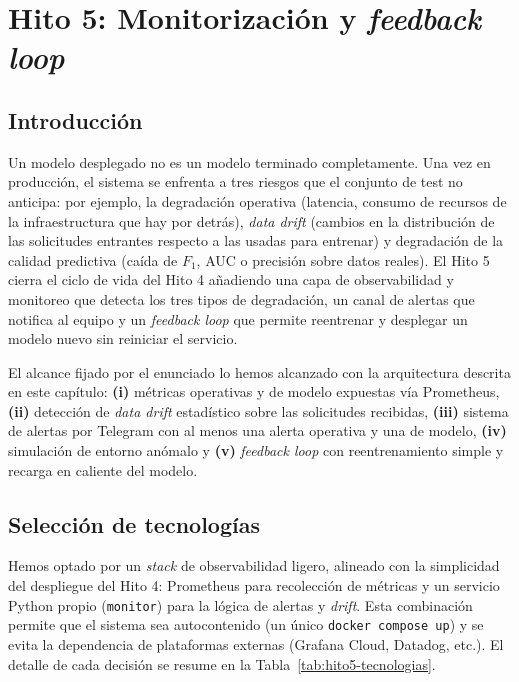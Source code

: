 \documentclass[12pt,a4paper]{report}
\begin{document}
\chapter{Hito 5: Monitorización y \textit{feedback loop}}
\label{ch:hito5}

\section{Introducción}
\label{sec:hito5-intro}

Un modelo desplegado no es un modelo terminado completamente. Una vez en producción, el sistema se enfrenta a tres riesgos que el conjunto de test no anticipa: por ejemplo, la degradación operativa (latencia, consumo de recursos de la infraestructura que hay por detrás), \textit{data drift} (cambios en la distribución de las solicitudes entrantes respecto a las usadas para entrenar) y degradación de la calidad predictiva (caída de $F_1$, AUC o precisión sobre datos reales). El Hito 5 cierra el ciclo de vida del Hito 4 añadiendo una capa de observabilidad y monitoreo que detecta los tres tipos de degradación, un canal de alertas que notifica al equipo y un \textit{feedback loop} que permite reentrenar y desplegar un modelo nuevo sin reiniciar el servicio.

El alcance fijado por el enunciado lo hemos alcanzado con la arquitectura descrita en este capítulo: \textbf{(i)} métricas operativas y de modelo expuestas vía Prometheus, \textbf{(ii)} detección de \textit{data drift} estadístico sobre las solicitudes recibidas, \textbf{(iii)} sistema de alertas por Telegram con al menos una alerta operativa y una de modelo, \textbf{(iv)} simulación de entorno anómalo y \textbf{(v)} \textit{feedback loop} con reentrenamiento simple y recarga en caliente del modelo.

\section{Selección de tecnologías}
\label{sec:hito5-stack}

Hemos optado por un \textit{stack} de observabilidad ligero, alineado con la simplicidad del despliegue del Hito 4: Prometheus para recolección de métricas y un servicio Python propio (\texttt{monitor}) para la lógica de alertas y \textit{drift}. Esta combinación permite que el sistema sea autocontenido (un único \texttt{docker compose up}) y se evita la dependencia de plataformas externas (Grafana Cloud, Datadog, etc.). El detalle de cada decisión se resume en la Tabla~\ref{tab:hito5-tecnologias}.
\end{document}
